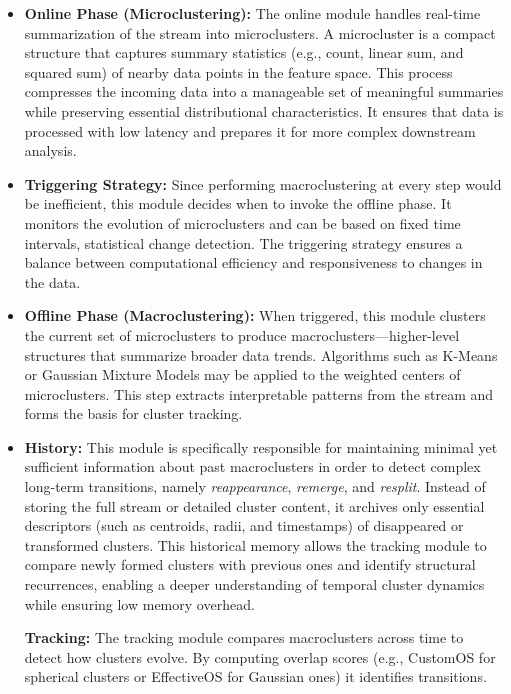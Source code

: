 \begin{itemize}

      \item \textbf{Online Phase (Microclustering):} The online module handles real-time
            summarization of the stream into microclusters. A microcluster is a compact
            structure that captures summary statistics (e.g., count, linear sum, and squared sum)
            of nearby data points in the feature space. This process compresses the incoming data
            into a manageable set of meaningful summaries while preserving essential distributional
            characteristics. It ensures that data is processed with low latency and prepares it
            for more complex downstream analysis.

      \item \textbf{Triggering Strategy:} Since performing macroclustering at every step
            would be inefficient, this module decides when to invoke the offline phase.
            It monitors the evolution of microclusters and can be based on fixed time intervals,
            statistical change detection. The triggering strategy ensures a balance between
            computational efficiency and responsiveness to changes in
            the data.

      \item \textbf{Offline Phase (Macroclustering):} When triggered, this module clusters the
            current set of microclusters to produce macroclusters—higher-level structures that
            summarize broader data trends. Algorithms such as K-Means or Gaussian Mixture
            Models may be applied to the weighted centers of microclusters. This step extracts
            interpretable patterns from the stream and forms the basis for cluster tracking.

      \item \textbf{History:} This module is specifically responsible for maintaining minimal
            yet sufficient information about past macroclusters in order to detect complex long-term
            transitions, namely \emph{reappearance}, \emph{remerge}, and \emph{resplit}.
            Instead of storing the full stream or detailed cluster content, it archives only
            essential descriptors (such as centroids, radii, and timestamps) of disappeared or
            transformed clusters. This historical memory allows the tracking module to compare
            newly formed clusters with previous ones and identify structural recurrences, enabling
            a deeper understanding of temporal cluster dynamics while ensuring low memory overhead.

            \textbf{Tracking:} The tracking module compares macroclusters across time to detect
            how clusters evolve. By computing overlap scores (e.g., CustomOS for spherical clusters
            or EffectiveOS for Gaussian ones) it identifies transitions.

\end{itemize}

